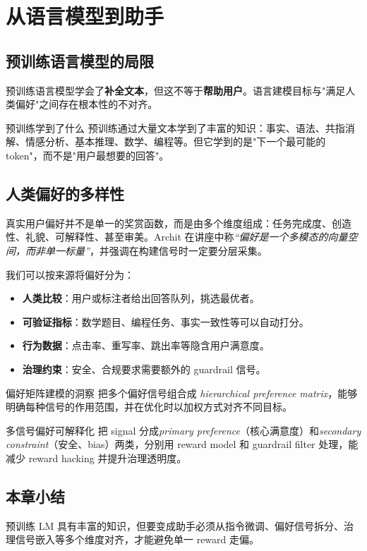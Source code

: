 \section{从语言模型到助手}

\subsection{预训练语言模型的局限}

预训练语言模型学会了\textbf{补全文本}，但这不等于\textbf{帮助用户}。语言建模目标与"满足人类偏好"之间存在根本性的不对齐。

\begin{knowledgebox}{预训练学到了什么}
预训练通过大量文本学到了丰富的知识：事实、语法、共指消解、情感分析、基本推理、数学、编程等。但它学到的是"下一个最可能的 token"，而不是"用户最想要的回答"。
\end{knowledgebox}

\subsection{人类偏好的多样性}

真实用户偏好并不是单一的奖赏函数，而是由多个维度组成：任务完成度、创造性、礼貌、可解释性、甚至审美。Archit 在讲座中称\textit{``偏好是一个多模态的向量空间，而非单一标量''}，并强调在构建信号时一定要分层采集。

我们可以按来源将偏好分为：
\begin{itemize}
    \item \textbf{人类比较}：用户或标注者给出回答队列，挑选最优者。
    \item \textbf{可验证指标}：数学题目、编程任务、事实一致性等可以自动打分。
    \item \textbf{行为数据}：点击率、重写率、跳出率等隐含用户满意度。
    \item \textbf{治理约束}：安全、合规要求需要额外的 guardrail 信号。
\end{itemize}

\begin{knowledgebox}{偏好矩阵建模的洞察}
把多个偏好信号组合成 \textit{hierarchical preference matrix}，能够明确每种信号的作用范围，并在优化时以加权方式对齐不同目标。
\end{knowledgebox}

\begin{importantbox}{多信号偏好可解释化}
把 signal 分成\textit{primary preference}（核心满意度）和\textit{secondary constraint}（安全、bias）两类，分别用 reward model 和 guardrail filter 处理，能减少 reward hacking 并提升治理透明度。
\end{importantbox}

\subsection{本章小结}

预训练 LM 具有丰富的知识，但要变成助手必须从指令微调、偏好信号拆分、治理信号嵌入等多个维度对齐，才能避免单一 reward 走偏。

